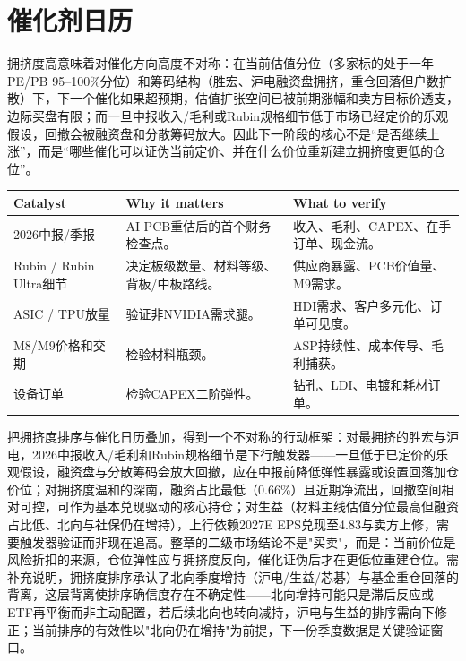 \section{催化剂日历}

拥挤度高意味着对催化方向高度不对称：在当前估值分位（多家标的处于一年PE/PB 95--100\%分位）和筹码结构（胜宏、沪电融资盘拥挤，重仓回落但户数扩散）下，下一个催化如果超预期，估值扩张空间已被前期涨幅和卖方目标价透支，边际买盘有限；而一旦中报收入/毛利或Rubin规格细节低于市场已经定价的乐观假设，回撤会被融资盘和分散筹码放大。因此下一阶段的核心不是“是否继续上涨”，而是“哪些催化可以证伪当前定价、并在什么价位重新建立拥挤度更低的仓位”。

\begin{exhibitbox}
\small
\begin{tabularx}{\textwidth}{L{3.2cm}X X}
\toprule
\textbf{Catalyst} & \textbf{Why it matters} & \textbf{What to verify} \\
\midrule
2026中报/季报 & AI PCB重估后的首个财务检查点。 & 收入、毛利、CAPEX、在手订单、现金流。 \\
Rubin / Rubin Ultra细节 & 决定板级数量、材料等级、背板/中板路线。 & 供应商暴露、PCB价值量、M9需求。 \\
ASIC / TPU放量 & 验证非NVIDIA需求腿。 & HDI需求、客户多元化、订单可见度。 \\
M8/M9价格和交期 & 检验材料瓶颈。 & ASP持续性、成本传导、毛利捕获。 \\
设备订单 & 检验CAPEX二阶弹性。 & 钻孔、LDI、电镀和耗材订单。 \\
\bottomrule
\end{tabularx}
\end{exhibitbox}

把拥挤度排序与催化日历叠加，得到一个不对称的行动框架：对最拥挤的胜宏与沪电，2026中报收入/毛利和Rubin规格细节是下行触发器——一旦低于已定价的乐观假设，融资盘与分散筹码会放大回撤，应在中报前降低弹性暴露或设置回落加仓价位；对拥挤度温和的深南，融资占比最低（0.66\%）且近期净流出，回撤空间相对可控，可作为基本兑现驱动的核心持仓；对生益（材料主线估值分位最高但融资占比低、北向与社保仍在增持），上行依赖2027E EPS兑现至4.83与卖方上修，需要触发器验证而非现在追高。整章的二级市场结论不是"买卖"，而是：当前价位是风险折扣的来源，仓位弹性应与拥挤度反向，催化证伪后才在更低位重建仓位。需补充说明，拥挤度排序承认了北向季度增持（沪电/生益/芯碁）与基金重仓回落的背离，这层背离使排序确信度存在不确定性——北向增持可能只是滞后反应或ETF再平衡而非主动配置，若后续北向也转向减持，沪电与生益的排序需向下修正；当前排序的有效性以"北向仍在增持"为前提，下一份季度数据是关键验证窗口。

